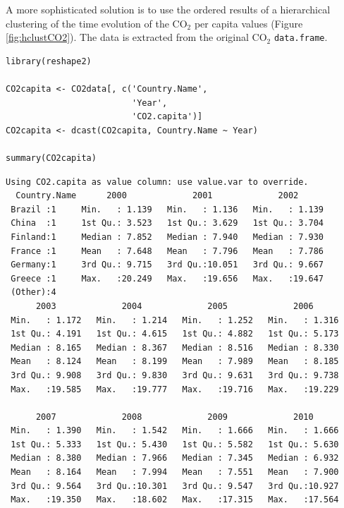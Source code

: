 \documentclass[smallroyalvopaper]{memoir}
\begin{document}
A more sophisticated solution is to use the ordered results of a
hierarchical clustering of the time evolution of the \(\mathrm{CO_2}\) per capita
values (Figure \ref{fig:hclustCO2}). The data is extracted from the
original \(\mathrm{CO_2}\) \texttt{data.frame}.  

\lstset{language=r,label= ,caption= ,captionpos=b,numbers=none}
\begin{lstlisting}
library(reshape2)

CO2capita <- CO2data[, c('Country.Name',
                         'Year',
                         'CO2.capita')]
CO2capita <- dcast(CO2capita, Country.Name ~ Year)

summary(CO2capita)
\end{lstlisting}

\begin{verbatim}
Using CO2.capita as value column: use value.var to override.
  Country.Name      2000             2001             2002       
 Brazil :1     Min.   : 1.139   Min.   : 1.136   Min.   : 1.139  
 China  :1     1st Qu.: 3.523   1st Qu.: 3.629   1st Qu.: 3.704  
 Finland:1     Median : 7.852   Median : 7.940   Median : 7.930  
 France :1     Mean   : 7.648   Mean   : 7.796   Mean   : 7.786  
 Germany:1     3rd Qu.: 9.715   3rd Qu.:10.051   3rd Qu.: 9.667  
 Greece :1     Max.   :20.249   Max.   :19.656   Max.   :19.647  
 (Other):4                                                       
      2003             2004             2005             2006       
 Min.   : 1.172   Min.   : 1.214   Min.   : 1.252   Min.   : 1.316  
 1st Qu.: 4.191   1st Qu.: 4.615   1st Qu.: 4.882   1st Qu.: 5.173  
 Median : 8.165   Median : 8.367   Median : 8.516   Median : 8.330  
 Mean   : 8.124   Mean   : 8.199   Mean   : 7.989   Mean   : 8.185  
 3rd Qu.: 9.908   3rd Qu.: 9.830   3rd Qu.: 9.631   3rd Qu.: 9.738  
 Max.   :19.585   Max.   :19.777   Max.   :19.716   Max.   :19.229  
                                                                    
      2007             2008             2009             2010       
 Min.   : 1.390   Min.   : 1.542   Min.   : 1.666   Min.   : 1.666  
 1st Qu.: 5.333   1st Qu.: 5.430   1st Qu.: 5.582   1st Qu.: 5.630  
 Median : 8.380   Median : 7.966   Median : 7.345   Median : 6.932  
 Mean   : 8.164   Mean   : 7.994   Mean   : 7.551   Mean   : 7.900  
 3rd Qu.: 9.564   3rd Qu.:10.301   3rd Qu.: 9.547   3rd Qu.:10.927  
 Max.   :19.350   Max.   :18.602   Max.   :17.315   Max.   :17.564
\end{verbatim}
\end{document}
